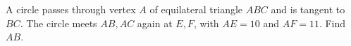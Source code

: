 A circle passes through vertex $A$ of equilateral triangle $ABC$ and is tangent to $BC$. The circle meets $AB,AC$ again at $E,F$, with $AE=10$ and $AF=11$. Find $AB$.
